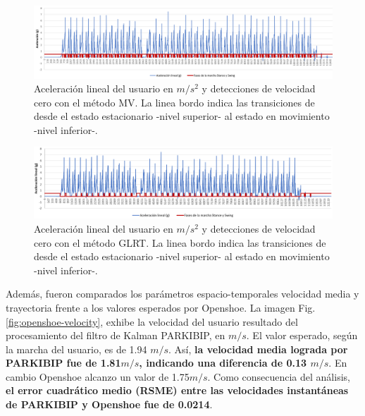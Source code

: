 \begin{figure}[h!]
\hspace*{-2.9cm}%
\includegraphics[clip,width=1.4 \columnwidth]{TESIS/imagenes/chap06/acceleration-zvd-openshoe-mv.PNG}
\caption{Aceleración lineal del usuario en $m/s^2$ y detecciones de velocidad cero con el método MV. La linea bordo indica las transiciones de desde el estado estacionario -nivel superior- al estado en movimiento -nivel inferior-.}
\label{fig:openshoe-mv}
\end{figure}

\begin{figure}[h!]
\hspace*{-2.9cm}%
\includegraphics[clip,width=1.4 \columnwidth]{TESIS/imagenes/chap06/acceleration-zvd-openshoe-glrt.PNG}
\caption{Aceleración lineal del usuario en $m/s^2$ y detecciones de velocidad cero con el método GLRT. La linea bordo indica las transiciones de desde el estado estacionario -nivel superior- al estado en movimiento -nivel inferior-.}
\label{fig:openshoe-glrt}
\end{figure}

Además, fueron comparados los parámetros espacio-temporales velocidad media y trayectoria frente a los valores esperados por Openshoe. La imagen Fig. \ref{fig:openshoe-velocity}, exhibe la velocidad del usuario resultado del procesamiento del filtro de Kalman PARKIBIP, en $m/s$. El valor esperado, según la marcha del usuario, es de 1.94 $m/s$. Así, \textbf{la velocidad media lograda por PARKIBIP fue de 1.81$m/s$, indicando una diferencia de 0.13 $m/s$}.  En cambio Openshoe alcanzo un valor de 1.75$m/s$. Como consecuencia del análisis, \textbf{el error cuadrático medio (RSME) entre las velocidades instantáneas de PARKIBIP y Openshoe fue de 0.0214}.

